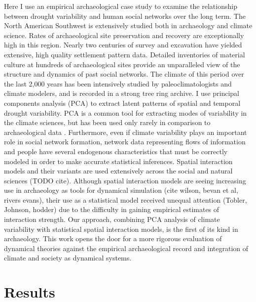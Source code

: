 \documentclass[11pt]{wlscirep}
\begin{document}
Here I use an empirical archaeological case study to examine the relationship between drought variability and human social networks over the long term. The North American Southwest is extensively studied both in archaeology and climate science. Rates of archaeological site preservation and recovery are exceptionally high in this region. Nearly two centuries of survey and excavation have yielded extensive, high quality settlement pattern data. Detailed inventories of material culture at hundreds of archaeological sites provide an unparalleled view of the structure and dynamics of past social networks. The climate of this period over the last 2,000 years has been intensively studied by paleoclimatologists and climate modelers, and is recorded in a strong tree ring archive. I use principal components analysis (PCA) to extract latent patterns of spatial and temporal drought variability. PCA is a common tool for extracting modes of variability in the climate sciences, but has been used only rarely in comparison to archaeological data \cite{Weiss1982,vanwest}. Furthermore, even if climate variability plays an important role in social network formation, network data representing flows of information and people have several endogenous characteristics that must be correctly modeled in order to make accurate statistical inferences. Spatial interaction models and their variants are used extensively across the social and natural sciences (TODO cite). Although spatial interaction models are seeing increasing use in archaeology as tools for dynamical simulation (cite wilson, bevan et al, rivers evans), their use as a statistical model received unequal attention (Tobler, Johnson, hodder) due to the difficulty in gaining empirical estimates of interaction strength. Our approach, combining PCA analysis of climate variability with statistical spatial interaction models, is the first of its kind in archaeology. This work opens the door for a more rigorous evaluation of dynamical theories against the empirical archaeological record and integration of climate and society as dynamical systems.


\section*{Results}
\end{document}
